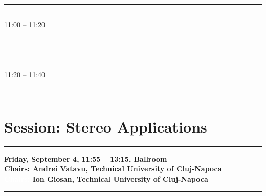             
            \\ 
            \noindent\rule{\textwidth}{0.4pt}
\vspace*{-36pt}\subsection[ 
    	   {\bf Improving local stereo algorithms using binary shifted windows, fusion and smoothness constraint
           } \\
           {\it Mircea Paul Muresan, Sergiu Nedevschi, Mihai Negru
           }
	]
	    {
            }
	    11:00 -- 11:20 \nopagebreak

            
            \\ 
            \noindent\rule{\textwidth}{0.4pt}
\vspace*{-36pt}\subsection[ 
    	   {\bf Fusion of Stereo and Structure from Motion for enhancing PatchMatch Stereo
           } \\
           {\it Claudiu Decean, Sergiu Nedevschi
           }
	]
	    {
            }
	    11:20 -- 11:40 \nopagebreak

            
            \\ 

\section{{\bf \large Session: %
Stereo Applications
}} \vspace{-15pt} %
\noindent\rule{\textwidth}{0.4pt} \nopagebreak
{\bf  
Friday, September 4, 11:55 -- 13:15, Ballroom
} \\ \nopagebreak
{\bf  Chairs: 
Andrei Vatavu, Technical University of Cluj-Napoca
} \\ \nopagebreak 
{\bf  \textcolor{white}{Chairs:} 
Ion Giosan, Technical University of Cluj-Napoca
} \\ \nopagebreak 
\noindent\rule{\textwidth}{0.4pt} \nopagebreak


